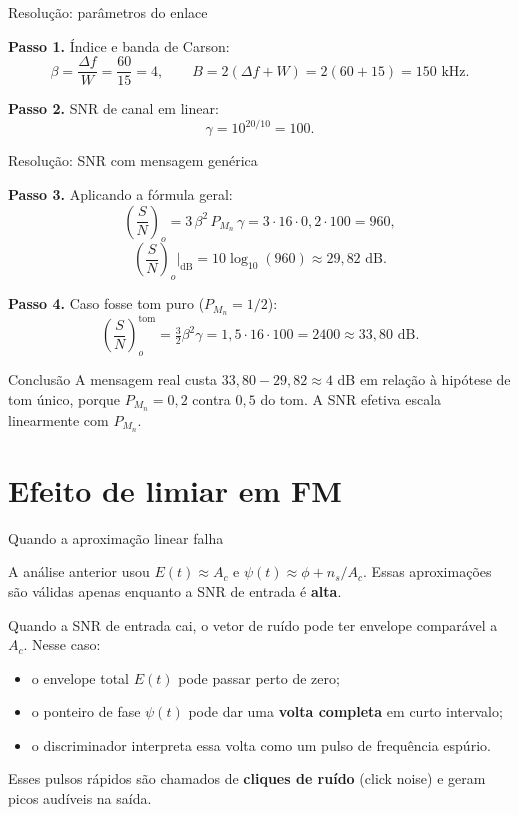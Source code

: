 
\begin{frame}{Resolução: parâmetros do enlace}

\textbf{Passo 1.} Índice e banda de Carson:
\[
\beta = \frac{\Delta f}{W} = \frac{60}{15} = 4, \qquad B = 2(\Delta f + W) = 2(60 + 15) = 150 \text{ kHz}.
\]

\textbf{Passo 2.} SNR de canal em linear:
\[
\gamma = 10^{20/10} = 100.
\]

\end{frame}


\begin{frame}{Resolução: SNR com mensagem genérica}

\textbf{Passo 3.} Aplicando a fórmula geral:
\[
\left(\frac{S}{N}\right)_o = 3\,\beta^2\, P_{M_n}\, \gamma = 3\cdot 16 \cdot 0{,}2 \cdot 100 = 960,
\]
\[
\left(\frac{S}{N}\right)_o\bigg|_{\text{dB}} = 10\log_{10}(960) \approx 29{,}82 \text{ dB}.
\]

\textbf{Passo 4.} Caso fosse tom puro ($P_{M_n} = 1/2$):
\[
\left(\frac{S}{N}\right)_o^{\text{tom}} = \tfrac{3}{2}\beta^2\gamma = 1{,}5\cdot 16 \cdot 100 = 2400 \approx 33{,}80 \text{ dB}.
\]

\begin{block}{Conclusão}
A mensagem real custa $33{,}80 - 29{,}82 \approx 4$ dB em relação à hipótese de tom único, porque $P_{M_n} = 0{,}2$ contra $0{,}5$ do tom. A SNR efetiva escala linearmente com $P_{M_n}$.
\end{block}

\end{frame}


\section{Efeito de limiar em FM}

\begin{frame}{Quando a aproximação linear falha}

A análise anterior usou $E(t) \approx A_c$ e $\psi(t) \approx \phi + n_s/A_c$. Essas aproximações são válidas apenas enquanto a SNR de entrada é \textbf{alta}.

\vspace{0.3cm}

Quando a SNR de entrada cai, o vetor de ruído pode ter envelope comparável a $A_c$. Nesse caso:
\begin{itemize}
\item o envelope total $E(t)$ pode passar perto de zero;
\item o ponteiro de fase $\psi(t)$ pode dar uma \textbf{volta completa} em curto intervalo;
\item o discriminador interpreta essa volta como um pulso de frequência espúrio.
\end{itemize}

Esses pulsos rápidos são chamados de \textbf{cliques de ruído} (click noise) e geram picos audíveis na saída.

\end{frame}

